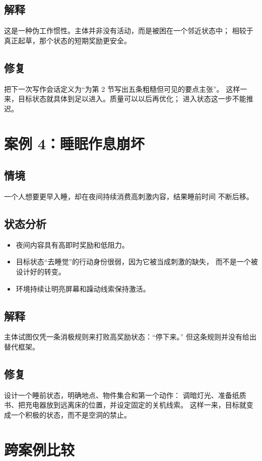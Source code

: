\subsection*{解释}
这是一种伪工作惯性。主体并非没有活动，而是被困在一个邻近状态中；
相较于真正起草，那个状态的短期奖励更安全。

\subsection*{修复}
把下一次写作会话定义为“为第 2 节写出五条粗糙但可见的要点主张”。
这样一来，目标状态就具体到足以进入。质量可以以后再优化；
进入状态这一步不能推迟。

\section{案例 4：睡眠作息崩坏}

\subsection*{情境}
一个人想要更早入睡，却在夜间持续消费高刺激内容，结果睡前时间
不断后移。

\subsection*{状态分析}
\begin{itemize}[nosep]
  \item 夜间内容具有高即时奖励和低阻力。
  \item 目标状态“去睡觉”的行动身份很弱，因为它被当成刺激的缺失，
        而不是一个被设计好的转变。
  \item 环境持续让明亮屏幕和躁动线索保持激活。
\end{itemize}

\subsection*{解释}
主体试图仅凭一条消极规则来打败高奖励状态：``停下来。''
但这条规则并没有给出替代框架。

\subsection*{修复}
设计一个睡前状态，明确地点、物件集合和第一个动作：
调暗灯光、准备纸质书、把充电器放到远离床的位置，并设定固定的关机线索。
这样一来，目标就变成一个积极的状态，而不是空洞的禁止。

\section{跨案例比较}

